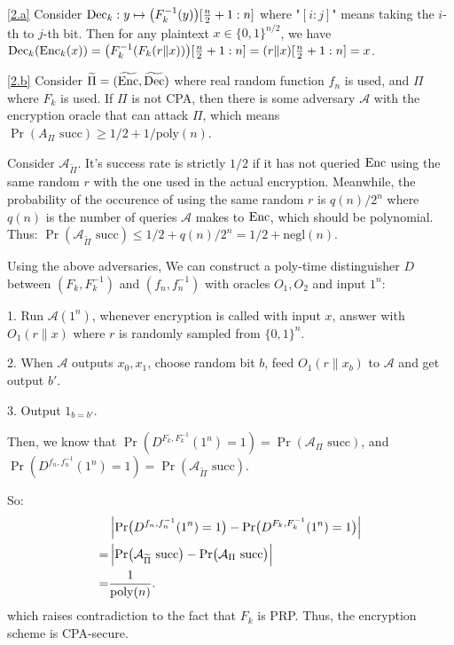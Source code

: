 \documentclass{homework}
\begin{document}
\begin{solution}
\ref{2.a} Consider $\mathrm{Dec}_k: y\mapsto \bigl(F_k^{-1}(y)\bigr)[\frac{n}{2}+1:n]$ where "$[i:j]$" means taking the $i$-th to $j$-th bit. Then for any plaintext $x\in\{0,1\}^{n/2}$, we have $\mathrm{Dec}_k(\mathrm{Enc}_k(x)) = \bigl(F_k^{-1}(F_k(r\|x))\bigr)[\frac{n}{2}+1:n] = (r\|x)[\frac{n}{2}+1:n] = x$.

\ref{2.b} Consider $\widetilde{\Pi} = (\widetilde{\mathrm{Enc}}, \widetilde{\mathrm{Dec}})$ where real random function $f_n$ is used, and $\Pi$ where $F_k$ is used. If $\Pi$ is not CPA, then there is some adversary $\mathcal{A}$ with the encryption oracle that can attack $\Pi$, which means $\Pr(A_{\Pi}\text{ succ}) \ge 1/2 + 1/\text{poly}(n)$. 

Consider $\mathcal{A}_{\widetilde{\Pi}}$. It's success rate is strictly $1/2$ if it has not queried $\mathrm{Enc}$ using the same random $r$ with the one used in the actual encryption. Meanwhile, the probability of the occurence of using the same random $r$ is $q(n)/2^n$ where $q(n)$ is the number of queries $\mathcal{A}$ makes to $\mathrm{Enc}$, which should be polynomial. Thus: $\Pr(\mathcal{A}_{\widetilde{\Pi}}\text{ succ}) \le 1/2 + q(n)/2^n = 1/2 + \text{negl}(n)$.

Using the above adversaries, We can construct a poly-time distinguisher $D$ between $(F_k,F_k^{-1})$ and $(f_n,f_n^{-1})$ with oracles $O_1,O_2$ and input $1^n$:

1. Run $\mathcal{A}(1^n)$, whenever encryption is called with input $x$, answer with $O_1(r\|x)$ where $r$ is randomly sampled from $\{0,1\}^{n}$.

2. When $\mathcal{A}$ outputs $x_0,x_1$, choose random bit $b$, feed $O_1(r\|x_b)$ to $\mathcal{A}$ and get output $b'$.

3. Output $1_{b=b'}$.

Then, we know that $\Pr(D^{F_k,F_k^{-1}}(1^n)=1) = \Pr(\mathcal{A}_{\Pi}\text{ succ})$, and $\Pr(D^{f_n,f_n^{-1}}(1^n)=1) = \Pr(\mathcal{A}_{\widetilde{\Pi}}\text{ succ})$.

So:
\begin{align*}
    & \left\lvert \Pr \bigl(D^{f_n,f_n^{-1}}(1^n) = 1 \bigr) -\Pr \bigl(D^{F_k,F_k^{-1}}(1^n) = 1 \bigr) \right\rvert \\
    = & \left\lvert \Pr \bigl(\mathcal{A}_{\widetilde{\Pi}} \text{ succ}\bigr) -\Pr \bigl(\mathcal{A}_{\Pi} \text{ succ} \bigr) \right\rvert\\
    = & \frac{1}{\mathrm{poly}(n)}.
\end{align*}
which raises contradiction to the fact that $F_k$ is PRP. Thus, the encryption scheme is CPA-secure.
\end{solution}
\end{document}
